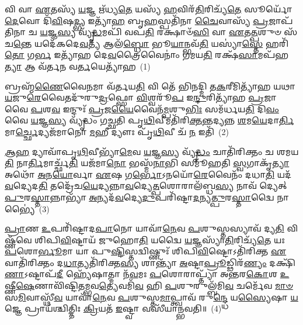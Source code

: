 \setcounter{anuvakam}{0}
𑌵𑌿 𑌵𑌾 \ul{𑌏}\-𑌤𑌸𑍍𑌯᳴ \ul{𑌯}\-𑌜𑍍𑌞 𑌋᳴𑌧𑍍𑌯\-\ul{𑌤𑍇} 𑌯𑌸𑍍𑌯᳴ \ul{𑌹}\-𑌵𑌿𑌰᳴\-\ul{𑌤𑌿}\-𑌰𑌿𑌚𑍍𑌯᳴\-\ul{𑌤𑍇} 𑌸𑍂𑌰𑍍𑌯𑍋᳴ \ul{𑌦𑍇}\-𑌵𑍋 𑌦𑌿᳴\-\ul{𑌵𑌿}\-𑌷\-\ul{𑌦𑍍𑌭𑍍𑌯} 𑌇𑌤𑍍𑌯𑌾᳴\-\ul{𑌹} 𑌬𑍃\-\ul{𑌹}\-𑌸𑍍𑌪𑌤𑌿᳴𑌨𑌾 \ul{𑌚𑍈}\-𑌵𑌾𑌸𑍍𑌯᳴ \ul{𑌪𑍍𑌰}\-𑌜𑌾𑌪᳴𑌤𑌿𑌨𑌾 𑌚 \ul{𑌯}\-𑌜𑍍𑌞\-\ul{𑌸𑍍𑌯} 𑌵𑍍𑌯𑍃᳴\-\ul{𑌦𑍍𑌧}\-𑌮𑌪𑌿᳴ 𑌵𑌪\-\ul{𑌤𑌿} 𑌰𑌕𑍍𑌷𑌾𑍞᳴\-\ul{𑌸𑌿} 𑌵𑌾 \ul{𑌏}\-𑌤\-\ul{𑌤𑍍𑌪}\-𑌶𑍁𑍞 𑌸᳴𑌚\-\ul{𑌨𑍍𑌤𑍇} 𑌯𑌦𑍇᳴𑌕𑌦𑍇\-\ul{𑌵}\-𑌤𑍍𑌯᳴ 𑌆𑌲᳴\-\ul{𑌬𑍍𑌧𑍋} 𑌭𑍂\-\ul{𑌯𑌾}\-𑌨𑍍𑌭𑌵᳴\-\ul{𑌤𑌿} 𑌯𑌸𑍍𑌯𑌾॑\-\ul{𑌸𑍍𑌤𑍇} 𑌹𑌰𑌿᳴\-\ul{𑌤𑍋} 𑌗\-\ul{𑌰𑍍𑌭} 𑌇𑌤𑍍𑌯𑌾᳴𑌹 𑌦𑍇\-\ul{𑌵}\-𑌤𑍍𑌰𑍈𑌵𑍈𑌨𑌾𑌂॑ 𑌗𑌮𑌯\-\ul{𑌤𑌿} 𑌰𑌕𑍍𑌷᳴\-\ul{𑌸𑌾}\-𑌮𑌪᳴𑌹\-\ul{𑌤𑍍𑌯𑌾} 𑌆 𑌵᳴𑌰𑍍𑌤𑌨 𑌵\-\ul{𑌰𑍍𑌤}\-𑌯𑍇𑌤𑍍𑌯𑌾᳴𑌹~(1)

𑌬𑍍𑌰𑌹𑍍𑌮᳴\-\ul{𑌣𑍈}\-𑌵𑍈\-\ul{𑌨}\-𑌮𑌾 𑌵᳴𑌰𑍍𑌤𑌯\-\ul{𑌤𑌿} 𑌵𑌿 𑌤𑍇᳴ 𑌭𑌿𑌨𑌦𑍍𑌮𑌿 𑌤\-\ul{𑌕}\-𑌰𑍀𑌮𑌿𑌤𑍍𑌯𑌾᳴𑌹 𑌯𑌥𑌾\-\ul{𑌯}\-𑌜𑍁\-\ul{𑌰𑍇}\-𑌵𑍈𑌤𑌦𑍁᳴𑌰𑍁\-\ul{𑌦𑍍𑌰}\-𑌫𑍍𑌸𑍋 \ul{𑌵𑌿}\-𑌶𑍍𑌵𑌰𑍂᳴\-\ul{𑌪} 𑌇\-\ul{𑌨𑍍𑌦𑍁}\-𑌰𑌿𑌤𑍍𑌯𑌾᳴𑌹 \ul{𑌪𑍍𑌰}\-𑌜𑌾 𑌵𑍈 \ul{𑌪}\-𑌶\-\ul{𑌵} 𑌇𑌨𑍍𑌦𑍁𑌃᳴ \ul{𑌪𑍍𑌰}\-𑌜\-\ul{𑌯𑍈}\-𑌵𑍈𑌨᳴\-\ul{𑌮𑍍𑌪}\-𑌶𑍁\-\ul{𑌭𑌿𑌃} 𑌸𑌮᳴𑌰𑍍𑌧𑌯\-\ul{𑌤𑌿} 𑌦𑌿\-\ul{𑌵𑌂} 𑌵𑍈 \ul{𑌯}\-𑌜𑍍𑌞\-\ul{𑌸𑍍𑌯} 𑌵𑍍𑌯𑍃᳴𑌦𑍍𑌧𑌂 𑌗𑌚𑍍𑌛𑌤𑌿 𑌪𑍃\-\ul{𑌥𑌿}\-𑌵𑍀𑌮𑌤𑌿᳴𑌰𑌿\-\ul{𑌕𑍍𑌤}\-𑌨𑍍𑌤𑌦𑍍𑌯𑌨𑍍𑌨 \ul{𑌶}\-𑌮\-\ul{𑌯𑍇}\-𑌦𑌾\-\ul{𑌰𑍍𑌤𑌿}\-𑌮𑌾\-\ul{𑌰𑍍𑌚𑍍𑌛𑍇}\-𑌦𑍍𑌯𑌜᳴𑌮𑌾𑌨𑍋 \ul{𑌮}\-𑌹𑍀 𑌦𑍍𑌯𑍗𑌃 𑌪𑍃᳴\-\ul{𑌥𑌿}\-𑌵𑍀 𑌚᳴ \ul{𑌨} 𑌇𑌤𑌿᳴~(2)

\-\ul{𑌆}\-\-\ul{𑌹} 𑌦𑍍𑌯𑌾𑌵𑌾᳴𑌪𑍃\-\ul{𑌥𑌿}\-𑌵𑍀𑌭𑍍𑌯𑌾᳴\-\ul{𑌮𑍇}\-𑌵 \ul{𑌯}\-𑌜𑍍𑌞\-\ul{𑌸𑍍𑌯} 𑌵𑍍𑌯𑍃᳴\-\ul{𑌦𑍍𑌧𑌂} 𑌚𑌾𑌤𑌿᳴𑌰𑌿𑌕𑍍𑌤𑌂 𑌚 𑌶𑌮𑌯\-\ul{𑌤𑌿} 𑌨𑌾\-\ul{𑌰𑍍𑌤𑌿}\-𑌮𑌾𑌰𑍍𑌚𑍍𑌛᳴\-\ul{𑌤𑌿} 𑌯𑌜᳴𑌮𑌾\-\ul{𑌨𑍋} 𑌭𑌸𑍍𑌮᳴\-\ul{𑌨𑌾}\-𑌭𑌿 𑌸𑌮𑍂᳴𑌹𑌤𑌿 \ul{𑌸𑍍𑌵}\-𑌗𑌾𑌕𑍃᳴\-\ul{𑌤𑍍𑌯𑌾} 𑌅𑌥𑍋᳴ \ul{𑌅}\-𑌨\-\ul{𑌯𑍋}\-𑌰𑍍𑌵𑌾 \ul{𑌏}\-𑌷 𑌗\-\ul{𑌰𑍍𑌭𑍋}\-\-𑌽𑌨𑌯𑍋᳴\-\ul{𑌰𑍇}\-𑌵𑍈𑌨𑌂᳴ 𑌦𑌧𑌾\-\ul{𑌤𑌿} 𑌯𑌦᳴\-\ul{𑌵}\-𑌦𑍍𑌯𑍇𑌦\-\ul{𑌤𑌿} 𑌤𑌦𑍍𑌰𑍇᳴𑌚\-\ul{𑌯𑍇}\-𑌦𑍍𑌯𑌨𑍍𑌨𑌾\-\ul{𑌵}\-𑌦𑍍𑌯𑍇\-\ul{𑌤𑍍𑌪}\-𑌶𑍋𑌰𑌾𑌲᳴𑌬𑍍𑌧\-\ul{𑌸𑍍𑌯} 𑌨𑌾𑌵᳴ 𑌦𑍍𑌯𑍇𑌤𑍍 \ul{𑌪𑍁}\-𑌰\-\ul{𑌸𑍍𑌤𑌾}\-𑌨𑍍𑌨𑌾𑌭𑍍𑌯𑌾᳴ \ul{𑌅}\-𑌨𑍍𑌯𑌦᳴\-\ul{𑌵}\-𑌦𑍍𑌯𑍇\-\ul{𑌦𑍁}\-𑌪𑌰𑌿᳴𑌷𑍍𑌟𑌾\-\ul{𑌦}\-𑌨𑍍𑌯\-\ul{𑌤𑍍𑌪𑍁}\-𑌰\-\ul{𑌸𑍍𑌤𑌾}\-𑌦𑍍𑌵𑍈 𑌨𑌾𑌭𑍍𑌯𑍈॑~(3)

\-\ul{𑌪𑍍𑌰𑌾}\-𑌣 \ul{𑌉}\-𑌪𑌰𑌿᳴𑌷𑍍𑌟𑌾𑌦\-\ul{𑌪𑌾}\-𑌨𑍋 𑌯𑌾𑌵𑌾᳴\-\ul{𑌨𑍇}\-𑌵 \ul{𑌪}\-𑌶𑍁𑌸𑍍𑌤𑌸𑍍𑌯𑌾𑌵᳴ 𑌦𑍍𑌯\-\ul{𑌤𑌿} 𑌵𑌿𑌷𑍍𑌣᳴𑌵𑍇 𑌶𑌿𑌪𑌿\-\ul{𑌵𑌿}\-𑌷𑍍𑌟𑌾𑌯᳴ 𑌜𑍁𑌹𑍋\-\ul{𑌤𑌿} 𑌯𑌦𑍍𑌵𑍈 \ul{𑌯}\-𑌜𑍍𑌞𑌸𑍍𑌯𑌾᳴\-\ul{𑌤𑌿}\-𑌰𑌿𑌚𑍍𑌯᳴\-\ul{𑌤𑍇} 𑌯𑌃 \ul{𑌪}\-𑌶𑍋\-\ul{𑌰𑍍𑌭𑍂}\-𑌮𑌾 𑌯𑌾 𑌪𑍁\-\ul{𑌷𑍍𑌟𑌿}\-𑌸𑍍𑌤𑌦𑍍𑌵𑌿𑌷𑍍𑌣𑍁𑌃᳴ 𑌶𑌿𑌪𑌿\-\ul{𑌵𑌿}\-𑌷𑍍𑌟𑍋\-𑌽𑌤𑌿᳴𑌰𑌿𑌕𑍍𑌤 \ul{𑌏}\-𑌵𑌾𑌤𑌿᳴𑌰𑌿𑌕𑍍𑌤𑌂 𑌦\-\ul{𑌧𑌾}\-𑌤𑍍𑌯𑌤𑌿᳴𑌰𑌿𑌕𑍍𑌤\-\ul{𑌸𑍍𑌯} 𑌶𑌾𑌨𑍍𑌤𑍍𑌯𑌾᳴ \ul{𑌅}\-𑌷𑍍𑌟𑌾\-\ul{𑌪𑍍𑌰𑍂}\-𑌡𑍍𑌢𑌿𑌰᳴\-\ul{𑌣𑍍𑌯𑌂} 𑌦𑌕𑍍𑌷𑌿᳴\-\ul{𑌣𑌾}\-\-𑌽𑌷𑍍𑌟𑌾𑌪᳴\-\ul{𑌦𑍀} 𑌹𑍍𑌯𑍇᳴𑌷𑌾𑌤𑍍𑌮𑌾 𑌨᳴\-\ul{𑌵}\-𑌮𑌃 \ul{𑌪}\-𑌶𑍋𑌰𑌾𑌪𑍍𑌤𑍍𑌯𑌾᳴ 𑌅𑌨𑍍𑌤𑌰\-\ul{𑌕𑍋}\-𑌶 \ul{𑌉}\-𑌷𑍍𑌣𑍀\-\ul{𑌷𑍇}\-𑌣𑌾𑌵𑌿᳴𑌷𑍍𑌟𑌿𑌤𑌮𑍍𑌭𑌵\-\ul{𑌤𑍍𑌯𑍇}\-𑌵𑌮𑌿᳴\-\ul{𑌵} 𑌹𑌿 \ul{𑌪}\-𑌶𑍁𑌰𑍁𑌲𑍍𑌬᳴𑌮𑌿\-\ul{𑌵} 𑌚𑌰𑍍𑌮𑍇᳴𑌵 \ul{𑌮𑌾}\-\-\ul{𑍞}\-𑌸\-\ul{𑌮𑌿}\-𑌵𑌾𑌸𑍍𑌥𑍀᳴\-\ul{𑌵} 𑌯𑌾𑌵𑌾᳴\-\ul{𑌨𑍇}\-𑌵 \ul{𑌪}\-𑌶𑍁𑌸𑍍𑌤\-\ul{𑌮𑌾}\-𑌪𑍍𑌤𑍍𑌵𑌾𑌵᳴ 𑌰𑍁\-\ul{𑌨𑍍𑌦𑍍𑌧𑍇} 𑌯\-\ul{𑌸𑍍𑌯𑍈}\-𑌷𑌾 \ul{𑌯}\-𑌜𑍍𑌞𑍇 𑌪𑍍𑌰𑌾𑌯᳴𑌶𑍍𑌚𑌿𑌤𑍍𑌤𑌿𑌃 \ul{𑌕𑍍𑌰𑌿}\-𑌯𑌤᳴ \ul{𑌇}\-𑌷𑍍𑌟𑍍𑌵𑌾 𑌵𑌸𑍀᳴𑌯𑌾𑌨𑍍𑌭𑌵𑌤𑌿॥~(4)

